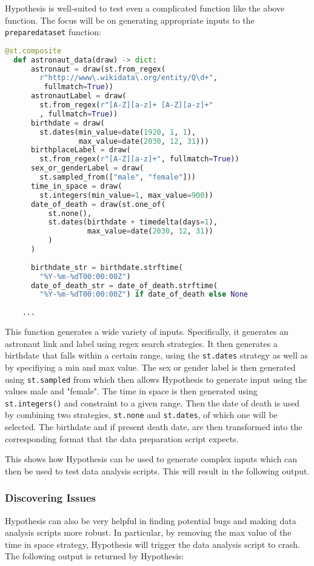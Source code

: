 \documentclass[runningheads]{llncs}
\begin{document}
\noindent Hypothesis is well-suited to test even a complicated function like the above function. The focus will be on generating appropriate inputs to the \texttt{preparedataset} function:

\begin{lstlisting}[language=Python]
  @st.composite
  def astronaut_data(draw) -> dict:
      astronaut = draw(st.from_regex(
        r"http://www\.wikidata\.org/entity/Q\d+",
         fullmatch=True))
      astronautLabel = draw(
        st.from_regex(r"[A-Z][a-z]+ [A-Z][a-z]+"
        , fullmatch=True))
      birthdate = draw(
        st.dates(min_value=date(1920, 1, 1), 
                 max_value=date(2030, 12, 31)))
      birthplaceLabel = draw(
        st.from_regex(r"[A-Z][a-z]+", fullmatch=True))
      sex_or_genderLabel = draw(
        st.sampled_from(["male", "female"]))
      time_in_space = draw(
        st.integers(min_value=1, max_value=900)) 
      date_of_death = draw(st.one_of(
          st.none(), 
          st.dates(birthdate + timedelta(days=1), 
                   max_value=date(2030, 12, 31))
          )
      )
  
      birthdate_str = birthdate.strftime(
        "%Y-%m-%dT00:00:00Z")
      date_of_death_str = date_of_death.strftime(
        "%Y-%m-%dT00:00:00Z") if date_of_death else None
  
    ...
\end{lstlisting}
This function generates a wide variety of inputs. Specifically, it generates an astronaut link and label using regex search strategies. It then generates a birthdate that falls within a certain range, using the \texttt{st.dates} strategy as well as by specifiying a min and max value. The sex or gender label is then generated using \texttt{st.sampled} from which then allows Hypothesis to generate input using the values male and "female". The time in space is then generated using \texttt{st.integers()} and constraint to a given range. Then the date of death is used by combining two strategies, \texttt{st.none} and \texttt{st.dates}, of which one will be selected. The birthdate and if present death date, are then transformed into the corresponding format that the data preparation script expects.

This shows how Hypothesis can be used to generate complex inputs which can then be used to test data analysis scripts. This will result in the following output.
\subsubsection{Discovering Issues}
Hypothesis can also be very helpful in finding potential bugs and making data analysis scripts more robust. In particular, by removing the max value of the time in space strategy, Hypothesis will trigger the data analysis script to crash. The following output is returned by Hypothesis:
\end{document}
